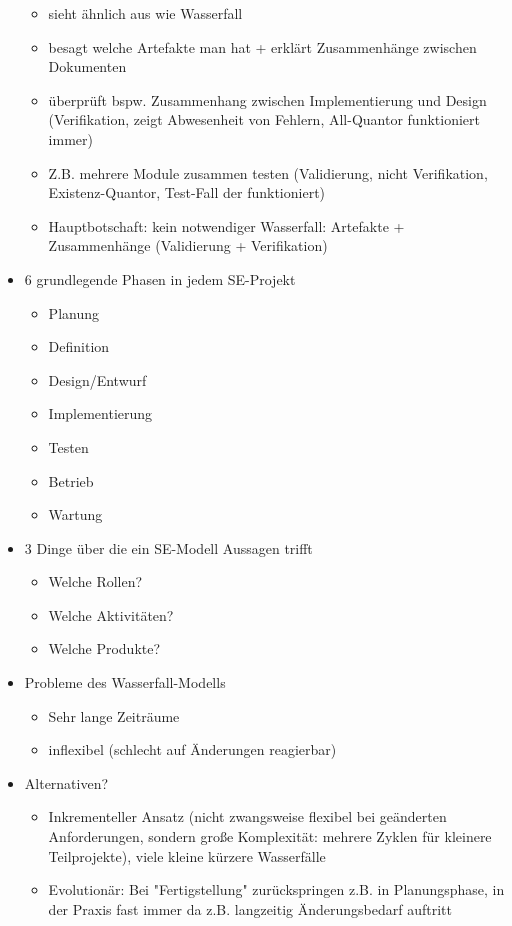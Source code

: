 \documentclass[paper=a4, fontsize=11pt]{scrartcl} %
\numberwithin{equation}{section} %
\numberwithin{figure}{section} %
\numberwithin{table}{section} %
\begin{document}
\begin{itemize}
  \begin{itemize}
    \item sieht ähnlich aus wie Wasserfall
    \item besagt welche Artefakte man hat + erklärt Zusammenhänge zwischen Dokumenten
    \item überprüft bspw. Zusammenhang zwischen Implementierung und Design (Verifikation, zeigt Abwesenheit von Fehlern, All-Quantor funktioniert immer)
    \item Z.B. mehrere Module zusammen testen (Validierung, nicht Verifikation, Existenz-Quantor, Test-Fall der funktioniert)
    \item Hauptbotschaft: kein notwendiger Wasserfall: Artefakte + Zusammenhänge (Validierung + Verifikation)
  \end{itemize}
  \item 6 grundlegende Phasen in jedem SE-Projekt
  \begin{itemize}
    \item Planung
    \item Definition
    \item Design/Entwurf
    \item Implementierung
    \item Testen
    \item Betrieb
    \item Wartung
  \end{itemize}
  \item 3 Dinge über die ein SE-Modell Aussagen trifft
  \begin{itemize}
    \item Welche Rollen?
    \item Welche Aktivitäten?
    \item Welche Produkte?
  \end{itemize}
  \item Probleme des Wasserfall-Modells
  \begin{itemize}
    \item Sehr lange Zeiträume
    \item inflexibel (schlecht auf Änderungen reagierbar)
  \end{itemize}
  \item Alternativen?
  \begin{itemize}
    \item Inkrementeller Ansatz (nicht zwangsweise flexibel bei geänderten Anforderungen, sondern große Komplexität: mehrere Zyklen für kleinere Teilprojekte), viele kleine kürzere Wasserfälle
    \item Evolutionär: Bei "Fertigstellung" zurückspringen z.B. in Planungsphase, in der Praxis fast immer da z.B. langzeitig Änderungsbedarf auftritt

\end{itemize}
\end{itemize}
\end{document}
